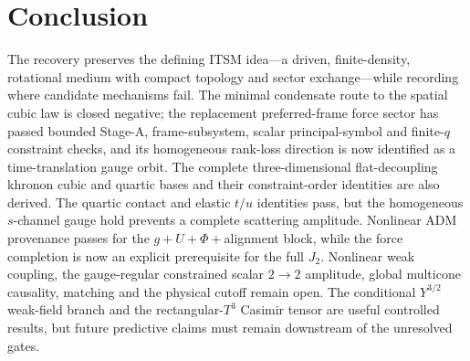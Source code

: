 ﻿\documentclass[11pt]{article}
\newcommand{\Tthree}{T^3}
\begin{document}
\section*{Conclusion}

The recovery preserves the defining ITSM idea---a driven, finite-density,
rotational medium with compact topology and sector exchange---while recording
where candidate mechanisms fail.  The minimal condensate route to the spatial
cubic law is closed negative; the replacement preferred-frame force sector has
passed bounded Stage-A, frame-subsystem, scalar principal-symbol and finite-$q$
constraint checks, and its homogeneous rank-loss direction is now identified
as a time-translation gauge orbit.  The complete three-dimensional
flat-decoupling khronon cubic and quartic bases and their constraint-order
identities are also derived.  The quartic contact and elastic $t/u$ identities
pass, but the homogeneous $s$-channel gauge hold prevents a complete scattering
amplitude.  Nonlinear ADM provenance passes for the $g+U+\Phi+$alignment block,
while the force completion is now an explicit prerequisite for the full $J_2$.
Nonlinear weak coupling, the gauge-regular constrained scalar
$2\to2$ amplitude, global multicone causality, matching and the physical cutoff
remain open.  The conditional $Y^{3/2}$ weak-field branch and
the rectangular-$\Tthree$ Casimir tensor are useful controlled results, but
future predictive claims must remain downstream of the unresolved gates.


\end{document}
